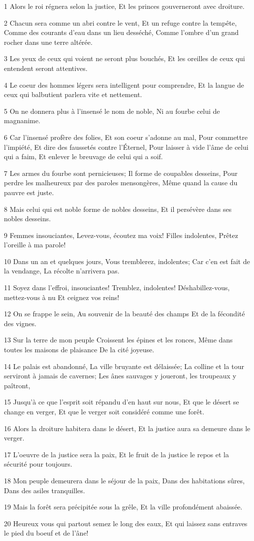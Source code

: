 \par 1 Alors le roi régnera selon la justice, Et les princes gouverneront avec droiture.
\par 2 Chacun sera comme un abri contre le vent, Et un refuge contre la tempête, Comme des courants d'eau dans un lieu desséché, Comme l'ombre d'un grand rocher dans une terre altérée.
\par 3 Les yeux de ceux qui voient ne seront plus bouchés, Et les oreilles de ceux qui entendent seront attentives.
\par 4 Le coeur des hommes légers sera intelligent pour comprendre, Et la langue de ceux qui balbutient parlera vite et nettement.
\par 5 On ne donnera plus à l'insensé le nom de noble, Ni au fourbe celui de magnanime.
\par 6 Car l'insensé profère des folies, Et son coeur s'adonne au mal, Pour commettre l'impiété, Et dire des faussetés contre l'Éternel, Pour laisser à vide l'âme de celui qui a faim, Et enlever le breuvage de celui qui a soif.
\par 7 Les armes du fourbe sont pernicieuses; Il forme de coupables desseins, Pour perdre les malheureux par des paroles mensongères, Même quand la cause du pauvre est juste.
\par 8 Mais celui qui est noble forme de nobles desseins, Et il persévère dans ses nobles desseins.
\par 9 Femmes insouciantes, Levez-vous, écoutez ma voix! Filles indolentes, Prêtez l'oreille à ma parole!
\par 10 Dans un an et quelques jours, Vous tremblerez, indolentes; Car c'en est fait de la vendange, La récolte n'arrivera pas.
\par 11 Soyez dans l'effroi, insouciantes! Tremblez, indolentes! Déshabillez-vous, mettez-vous à nu Et ceignez vos reins!
\par 12 On se frappe le sein, Au souvenir de la beauté des champs Et de la fécondité des vignes.
\par 13 Sur la terre de mon peuple Croissent les épines et les ronces, Même dans toutes les maisons de plaisance De la cité joyeuse.
\par 14 Le palais est abandonné, La ville bruyante est délaissée; La colline et la tour serviront à jamais de cavernes; Les ânes sauvages y joueront, les troupeaux y paîtront,
\par 15 Jusqu'à ce que l'esprit soit répandu d'en haut sur nous, Et que le désert se change en verger, Et que le verger soit considéré comme une forêt.
\par 16 Alors la droiture habitera dans le désert, Et la justice aura sa demeure dans le verger.
\par 17 L'oeuvre de la justice sera la paix, Et le fruit de la justice le repos et la sécurité pour toujours.
\par 18 Mon peuple demeurera dans le séjour de la paix, Dans des habitations sûres, Dans des asiles tranquilles.
\par 19 Mais la forêt sera précipitée sous la grêle, Et la ville profondément abaissée.
\par 20 Heureux vous qui partout semez le long des eaux, Et qui laissez sans entraves le pied du boeuf et de l'âne!

